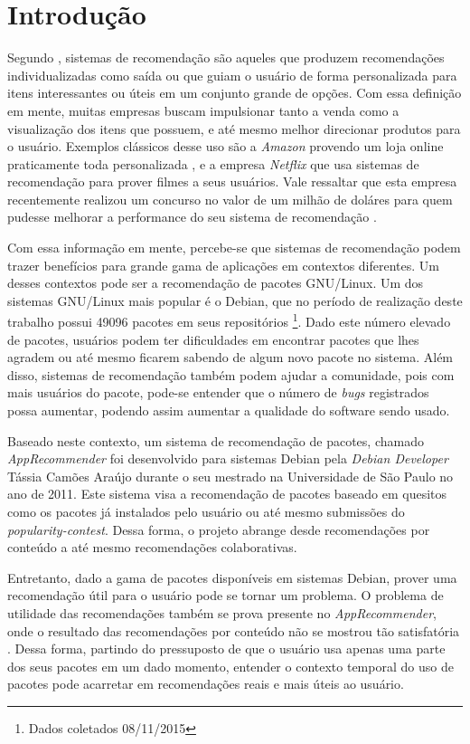 \chapter[Introdução]{Introdução}

Segundo , sistemas de recomendação são aqueles que
produzem recomendações individualizadas como saída ou que guiam o usuário
de forma personalizada para itens interessantes ou úteis em um conjunto
grande de opções. Com essa definição em mente, muitas empresas buscam
impulsionar tanto a venda como a visualização dos itens que possuem, e até mesmo
melhor direcionar produtos para o usuário. Exemplos clássicos desse uso são a
\textit{Amazon} provendo um loja online praticamente toda personalizada
\cite{jannach2008finding}, e a empresa \textit{Netflix} que usa sistemas de recomendação
para prover filmes a seus usuários. Vale ressaltar que esta empresa recentemente
realizou um concurso no valor de um milhão de doláres para quem pudesse melhorar
a performance do seu sistema de recomendação \cite{koren2009matrix}.

Com essa informação em mente, percebe-se que sistemas de recomendação podem
trazer benefícios para grande gama de aplicações em contextos diferentes. Um
desses contextos pode ser a recomendação de pacotes GNU/Linux. Um dos sistemas
GNU/Linux mais popular é o Debian, que no período de realização deste trabalho
possui 49096 pacotes em seus repositórios \footnote{Dados coletados
08/11/2015}. Dado este número elevado de pacotes, usuários podem ter
dificuldades em encontrar pacotes que lhes agradem ou até mesmo ficarem sabendo
de algum novo pacote no sistema. Além disso, sistemas de recomendação também
podem ajudar a comunidade, pois com mais usuários do pacote, pode-se entender que
o número de \textit{bugs} registrados possa aumentar, podendo assim aumentar a qualidade
do software sendo usado.

Baseado neste contexto, um sistema de recomendação de pacotes, chamado
\textit{AppRecommender} foi desenvolvido para sistemas Debian pela
\textit{Debian Developer} Tássia Camões Araújo durante
o seu mestrado na Universidade de São Paulo no ano de 2011. Este sistema visa a
recomendação de pacotes baseado em quesitos como os pacotes já instalados pelo
usuário ou até mesmo submissões do \textit{popularity-contest}. Dessa forma, o
projeto abrange desde recomendações por conteúdo a até mesmo recomendações
colaborativas.

Entretanto, dado a gama de pacotes disponíveis em sistemas Debian, prover uma
recomendação útil para o usuário pode se tornar um problema. O problema de
utilidade das recomendações também se prova presente no \textit{AppRecommender},
onde o resultado das recomendações por conteúdo não se mostrou tão satisfatória
\cite{araujo2011apprecommender}. Dessa forma, partindo do
pressuposto de que o usuário usa apenas uma parte dos seus pacotes em um dado
momento, entender o contexto temporal do uso de pacotes pode acarretar em recomendações reais e
mais úteis ao usuário.

